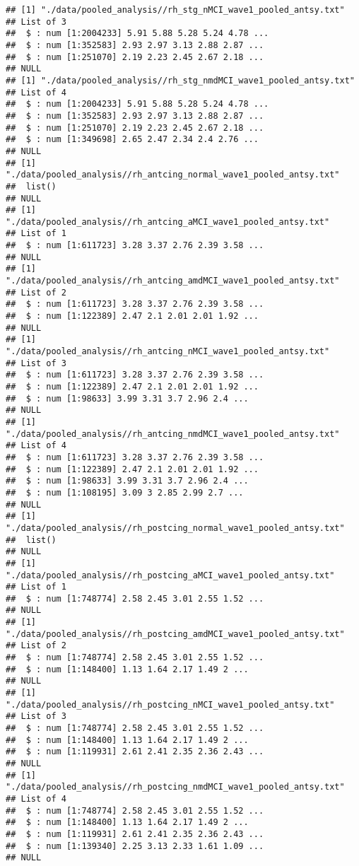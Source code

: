 \documentclass[12pt]{article}\usepackage[]{graphicx}\usepackage[]{color}
\makeatletter
\newenvironment{kframe}{%
 \def\at@end@of@kframe{}%
 \ifinner\ifhmode%
  \def\at@end@of@kframe{\end{minipage}}%
  \begin{minipage}{\columnwidth}%
 \fi\fi%
 \def\FrameCommand##1{\hskip\@totalleftmargin \hskip-\fboxsep
 \colorbox{shadecolor}{##1}\hskip-\fboxsep
     \hskip-\linewidth \hskip-\@totalleftmargin \hskip\columnwidth}%
 \MakeFramed {\advance\hsize-\width
   \@totalleftmargin\z@ \linewidth\hsize
   \@setminipage}}%
 {\par\unskip\endMakeFramed%
 \at@end@of@kframe}
\newenvironment{knitrout}{}{} %
\makeatother
\begin{document}
\begin{knitrout}
\begin{kframe}
\begin{verbatim}
## [1] "./data/pooled_analysis//rh_stg_nMCI_wave1_pooled_antsy.txt"
## List of 3
##  $ : num [1:2004233] 5.91 5.88 5.28 5.24 4.78 ...
##  $ : num [1:352583] 2.93 2.97 3.13 2.88 2.87 ...
##  $ : num [1:251070] 2.19 2.23 2.45 2.67 2.18 ...
## NULL
## [1] "./data/pooled_analysis//rh_stg_nmdMCI_wave1_pooled_antsy.txt"
## List of 4
##  $ : num [1:2004233] 5.91 5.88 5.28 5.24 4.78 ...
##  $ : num [1:352583] 2.93 2.97 3.13 2.88 2.87 ...
##  $ : num [1:251070] 2.19 2.23 2.45 2.67 2.18 ...
##  $ : num [1:349698] 2.65 2.47 2.34 2.4 2.76 ...
## NULL
## [1] "./data/pooled_analysis//rh_antcing_normal_wave1_pooled_antsy.txt"
##  list()
## NULL
## [1] "./data/pooled_analysis//rh_antcing_aMCI_wave1_pooled_antsy.txt"
## List of 1
##  $ : num [1:611723] 3.28 3.37 2.76 2.39 3.58 ...
## NULL
## [1] "./data/pooled_analysis//rh_antcing_amdMCI_wave1_pooled_antsy.txt"
## List of 2
##  $ : num [1:611723] 3.28 3.37 2.76 2.39 3.58 ...
##  $ : num [1:122389] 2.47 2.1 2.01 2.01 1.92 ...
## NULL
## [1] "./data/pooled_analysis//rh_antcing_nMCI_wave1_pooled_antsy.txt"
## List of 3
##  $ : num [1:611723] 3.28 3.37 2.76 2.39 3.58 ...
##  $ : num [1:122389] 2.47 2.1 2.01 2.01 1.92 ...
##  $ : num [1:98633] 3.99 3.31 3.7 2.96 2.4 ...
## NULL
## [1] "./data/pooled_analysis//rh_antcing_nmdMCI_wave1_pooled_antsy.txt"
## List of 4
##  $ : num [1:611723] 3.28 3.37 2.76 2.39 3.58 ...
##  $ : num [1:122389] 2.47 2.1 2.01 2.01 1.92 ...
##  $ : num [1:98633] 3.99 3.31 3.7 2.96 2.4 ...
##  $ : num [1:108195] 3.09 3 2.85 2.99 2.7 ...
## NULL
## [1] "./data/pooled_analysis//rh_postcing_normal_wave1_pooled_antsy.txt"
##  list()
## NULL
## [1] "./data/pooled_analysis//rh_postcing_aMCI_wave1_pooled_antsy.txt"
## List of 1
##  $ : num [1:748774] 2.58 2.45 3.01 2.55 1.52 ...
## NULL
## [1] "./data/pooled_analysis//rh_postcing_amdMCI_wave1_pooled_antsy.txt"
## List of 2
##  $ : num [1:748774] 2.58 2.45 3.01 2.55 1.52 ...
##  $ : num [1:148400] 1.13 1.64 2.17 1.49 2 ...
## NULL
## [1] "./data/pooled_analysis//rh_postcing_nMCI_wave1_pooled_antsy.txt"
## List of 3
##  $ : num [1:748774] 2.58 2.45 3.01 2.55 1.52 ...
##  $ : num [1:148400] 1.13 1.64 2.17 1.49 2 ...
##  $ : num [1:119931] 2.61 2.41 2.35 2.36 2.43 ...
## NULL
## [1] "./data/pooled_analysis//rh_postcing_nmdMCI_wave1_pooled_antsy.txt"
## List of 4
##  $ : num [1:748774] 2.58 2.45 3.01 2.55 1.52 ...
##  $ : num [1:148400] 1.13 1.64 2.17 1.49 2 ...
##  $ : num [1:119931] 2.61 2.41 2.35 2.36 2.43 ...
##  $ : num [1:139340] 2.25 3.13 2.33 1.61 1.09 ...
## NULL
\end{verbatim}
\end{kframe}
\end{knitrout}
\end{document}
